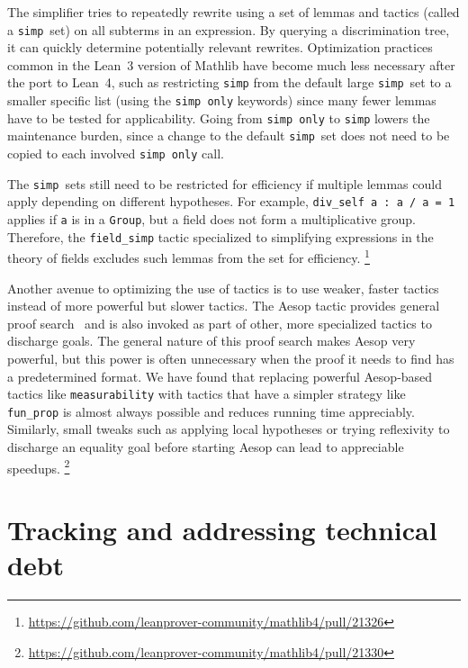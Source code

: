 \documentclass[runningheads]{llncs}
\def\mathlib{Mathlib\xspace}
\newcommand{\lean}[1]{\texttt{#1}}
\begin{document}
The simplifier tries to repeatedly rewrite using a set of lemmas and tactics (called a \lean{simp}~set) on all subterms in an expression.
By querying a discrimination tree, it can quickly determine potentially relevant rewrites.
Optimization practices common in the Lean~3 version of \mathlib have become much less necessary after the port to Lean~4,
such as restricting \lean{simp} from the default large \lean{simp}~set to a smaller specific list
(using the \lean{simp only} keywords)
since many fewer lemmas have to be tested for applicability.
Going from \lean{simp only} to \lean{simp} lowers the maintenance burden,
since a change to the default \lean{simp}~set does not need to be copied to each involved \lean{simp only} call.

The \lean{simp}~sets still need to be restricted for efficiency if multiple lemmas could apply depending on different hypotheses.
For example, \lean{div_self a : a / a = 1} applies if \lean{a} is in a \lean{Group},
but a field does not form a multiplicative group.
Therefore, the \lean{field_simp} tactic specialized to simplifying expressions in the theory of fields
excludes such lemmas from the set for efficiency.%
\footnote{\url{https://github.com/leanprover-community/mathlib4/pull/21326}}

Another avenue to optimizing the use of tactics is to use weaker, faster tactics instead of more powerful but slower tactics.
The Aesop tactic provides general proof search~\cite{LimpergAesop}
and is also invoked as part of other, more specialized tactics to discharge goals.
The general nature of this proof search makes Aesop very powerful,
but this power is often unnecessary when the proof it needs to find has a predetermined format.
We have found that replacing powerful Aesop-based tactics like \lean{measurability}
with tactics that have a simpler strategy like \lean{fun_prop} is almost always possible and reduces running time appreciably.
Similarly, small tweaks such as applying local hypotheses or trying reflexivity to discharge an equality goal before starting Aesop
can lead to appreciable speedups.%
\footnote{\url{https://github.com/leanprover-community/mathlib4/pull/21330}}

\section{Tracking and addressing technical debt}
\label{sec:techdebt}
\end{document}
